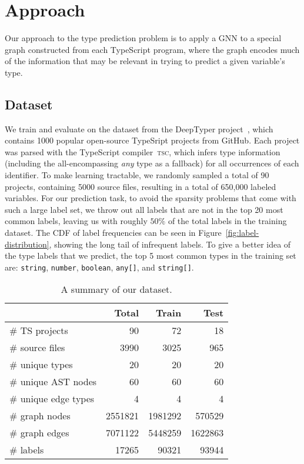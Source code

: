 \section{Approach}
\label{sec:approach}

Our approach to the type prediction problem is to apply a GNN to a special graph constructed from each TypeScript program, where the graph encodes much of the information that may be relevant in trying to predict a given variable's type.

\subsection{Dataset}
\label{sec:dataset}
We train and evaluate on the dataset from the DeepTyper project~\cite{hellendoorn2018deep}, which contains 1000 popular open-source TypeSript projects from GitHub.
 Each project was parsed with the TypeScript compiler~\textsc{tsc}, which infers type information (including the all-encompassing \textit{any} type as a fallback) for all occurrences of each identifier.
 To make learning tractable, we randomly sampled a total of 90 projects, containing 5000 source files, resulting in a total of 650,000 labeled variables.
 For our prediction task, to avoid the sparsity problems that come with such a large label set, we throw out all labels that are not in the top 20 most common labels, leaving us with roughly $50\%$ of the total labels in the training dataset.
 The CDF of label frequencies can be seen in Figure~\ref{fig:label-distribution}, showing the long tail of infrequent labels.
To give a better idea of the type labels that we predict, the top 5 most common types in the training set are: \texttt{string}, \texttt{number}, \texttt{boolean}, \texttt{any[]}, and \texttt{string[]}.


\begin{table}
	\centering
	{\renewcommand{\arraystretch}{1.15}%
		\begin{tabular}{l|rrr}
                  \textbf{~} & \textbf{Total} & \textbf{Train} & \textbf{Test} \\
                  \hline
                  \# TS projects & 90 & 72 & 18 \\
                  \# source files & 3990 & 3025 & 965 \\
                  \# unique types & 20 & 20 & 20 \\
                  \# unique AST nodes & 60 & 60 & 60 \\
                  \# unique edge types & 4 & 4 & 4 \\
                  \# graph nodes & 2551821 & 1981292 & 570529 \\
                  \# graph edges & 7071122 & 5448259 & 1622863 \\
                  \# labels  & 17265 & 90321 & 93944 \\
		\end{tabular}
	}
	\caption{A summary of our dataset.}
	\label{tab:dataset_sumamry}
\end{table}

